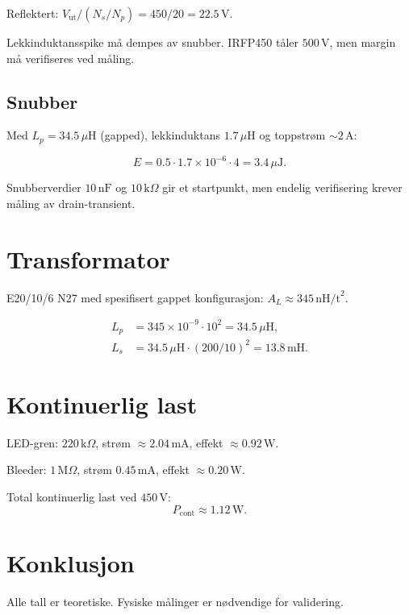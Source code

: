 \documentclass{article}
\begin{document}
Reflektert:
$V_{\text{ut}}/(N_s/N_p) = 450/20 = 22.5\,\text{V}$.

Lekkinduktansspike må dempes av snubber.
IRFP450 tåler $500\,\text{V}$, men margin må verifiseres ved måling.

\subsection{Snubber}

Med $L_p = 34.5\,\mu\text{H}$ (gapped),
lekkinduktans $1.7\,\mu\text{H}$ og toppstrøm $\sim 2\,\text{A}$:

\[
E =
0.5 \cdot 1.7\times10^{-6}\cdot4
=
3.4\,\mu\text{J}.
\]

Snubberverdier $10\,\text{nF}$ og $10\,\text{k}\Omega$ gir et startpunkt,
men endelig verifisering krever måling av drain-transient.

\section{Transformator}

E20/10/6 N27 med spesifisert gappet konfigurasjon:
$A_L \approx 345\,\text{nH/t}^2$.

\begin{align}
L_p &= 345 \times 10^{-9} \cdot 10^2
= 34.5\,\mu\text{H}, \\
L_s &= 34.5\,\mu\text{H}\cdot(200/10)^2
= 13.8\,\text{mH}.
\end{align}

\section{Kontinuerlig last}

LED-gren:
$220\,\text{k}\Omega$,
strøm $\approx 2.04\,\text{mA}$,
effekt $\approx 0.92\,\text{W}$.

Bleeder:
$1\,\text{M}\Omega$,
strøm $0.45\,\text{mA}$,
effekt $\approx 0.20\,\text{W}$.

Total kontinuerlig last ved $450\,\text{V}$:
\[
P_{\text{cont}} \approx 1.12\,\text{W}.
\]

\section{Konklusjon}

Alle tall er teoretiske. Fysiske målinger er nødvendige for validering.
\end{document}
